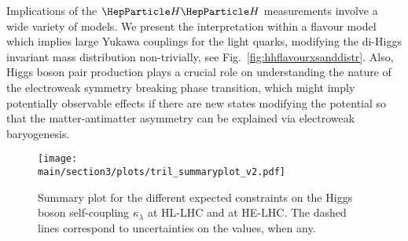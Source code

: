 \documentclass[../report.tex]{subfiles}
\providecommand{\main}{..}
\begin{document}
Implications of the $\HH$ measurements involve a wide variety of models. We present the interpretation within a flavour model which implies large Yukawa couplings for the light quarks, modifying the di-Higgs invariant mass distribution non-trivially, see Fig.~\ref{fig:hhflavourxsanddistr}. Also, Higgs boson pair production plays a crucial role on understanding the nature of the electroweak symmetry breaking phase transition, which might imply potentially observable effects if there are new states modifying the potential so that the matter-antimatter asymmetry can be explained via electroweak baryogenesis.


\begin{figure}[h]
  \centering
    \texttt{[image: \\main/section3/plots/tril\_summaryplot\_v2.pdf]}
\caption{Summary plot for the different expected constraints on the Higgs boson self-coupling $\kappa_\lambda$ at HL-LHC and at HE-LHC. The dashed lines correspond to uncertainties on the values, when any.}
\label{fig:tril_summaryplot}
\end{figure}
\end{document}
